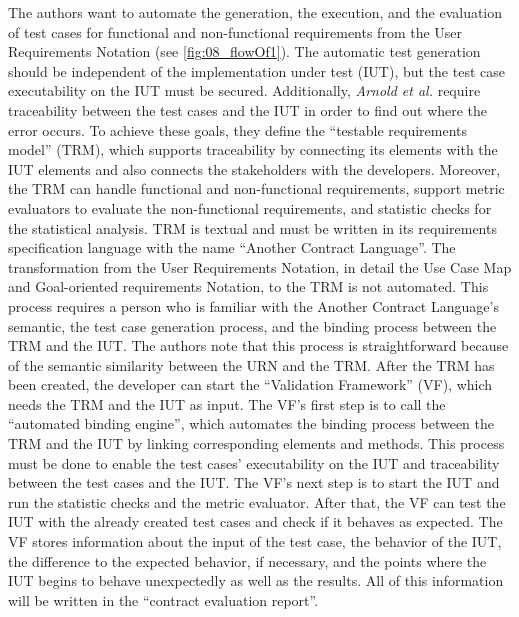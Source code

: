 The authors want to automate the generation, the execution, and the evaluation of test cases for functional and non-functional requirements from the User Requirements Notation (see \autoref{fig:08_flowOf1}). The automatic test generation should be independent of the implementation under test (IUT), but the test case executability on the IUT must be secured. Additionally, \textit{Arnold et al.} require traceability between the test cases and the IUT in order to find out where the error occurs. To achieve these goals, they define the \enquote{testable requirements model} (TRM), which supports traceability by connecting its elements with the IUT elements and also connects the stakeholders with the developers. Moreover, the TRM can handle functional and non-functional requirements, support metric evaluators to evaluate the non-functional requirements, and statistic checks for the statistical analysis. TRM is textual and must be written in its requirements specification language with the name \enquote{Another Contract Language}. The transformation from the User Requirements Notation, in detail the Use Case Map and Goal-oriented requirements Notation, to the TRM is not automated. This process requires a person who is familiar with the Another Contract Language's semantic, the test case generation process, and the binding process between the TRM and the IUT. The authors note that this process is straightforward because of the semantic similarity between the URN and the TRM. After the TRM has been created, the developer can start the \enquote{Validation Framework} (VF), which needs the TRM and the IUT as input. The VF's first step is to call the \enquote{automated binding engine}, which automates the binding process between the TRM and the IUT by linking corresponding elements and methods. This process must be done to enable the test cases' executability on the IUT and traceability between the test cases and the IUT. The VF's next step is to start the IUT and run the statistic checks and the metric evaluator. After that, the VF can test the IUT with the already created test cases and check if it behaves as expected. The VF stores information about the input of the test case, the behavior of the IUT, the difference to the expected behavior, if necessary, and the points where the IUT begins to behave unexpectedly as well as the results. All of this information will be written in the \enquote{contract evaluation report}.

